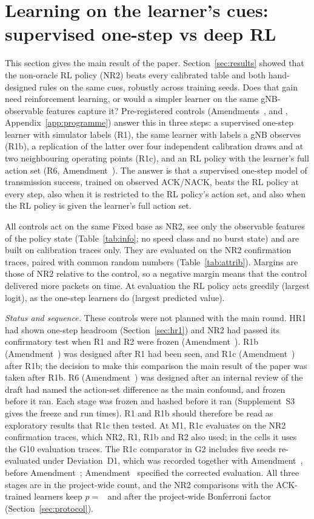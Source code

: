 \section{Learning on the learner's cues: supervised one-step vs deep RL}\label{sec:learners}\label{sec:attrib}
This section gives the main result of the paper. Section~\ref{sec:results} showed that the non-oracle RL policy (NR2) beats every calibrated table and both hand-designed rules on the same cues, robustly across training seeds. Does that gain need reinforcement learning, or would a simpler learner on the same gNB-observable features capture it? Pre-registered controls (Amendments~,  and , Appendix~\ref{app:programme}) answer this in three steps: a supervised one-step learner with simulator labels (R1), the same learner with labels a gNB observes (R1b), a replication of the latter over four independent calibration draws and at two neighbouring operating points (R1c), and an RL policy with the learner's full action set (R6, Amendment~). The answer is that a supervised one-step model of transmission success, trained on observed ACK/NACK, beats the RL policy at every step, also when it is restricted to the RL policy's action set, and also when the RL policy is given the learner's full action set.

All controls act on the same Fixed base as NR2, see only the  observable features of the policy state (Table~\ref{tab:info}; no speed class and no burst state) and are built on calibration traces only. They are evaluated on the  NR2 confirmation traces, paired with common random numbers (Table~\ref{tab:attrib}). Margins are those of NR2 relative to the control, so a negative margin means that the control delivered more packets on time. At evaluation the RL policy acts greedily (largest logit), as the one-step learners do (largest predicted value).

\emph{Status and sequence.} These controls were not planned with the main round. HR1 had shown one-step headroom (Section~\ref{sec:hr1}) and NR2 had passed its confirmatory test when R1 and R2 were frozen (Amendment~). R1b (Amendment~) was designed after R1 had been seen, and R1c (Amendment~) after R1b; the decision to make this comparison the main result of the paper was taken after R1b. R6 (Amendment~) was designed after an internal review of the draft had named the action-set difference as the main confound, and frozen before it ran. Each stage was frozen and hashed before it ran (Supplement~S3 gives the freeze and run times). R1 and R1b should therefore be read as exploratory results that R1c then tested. At M1, R1c evaluates on the NR2 confirmation traces, which NR2, R1, R1b and R2 also used; in the cells it uses the G10 evaluation traces. The R1c comparator in G2 includes five seeds re-evaluated under Deviation~D1, which was recorded together with Amendment~, before Amendment~; Amendment~ specified the corrected evaluation. All three stages are in the project-wide count, and the NR2 comparisons with the ACK-trained learners keep $p=$~\NBonfPProjGbtResAck{} and \NBonfPProjGbtFullAck{} after the project-wide Bonferroni factor (Section~\ref{sec:protocol}).

